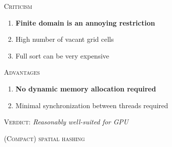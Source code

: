 \documentclass[14pt]{beamer}
\begin{document}
\begin{frame}
\centering
{
\begin{minipage}[c][.7\textheight][t]{.9\textwidth}
\centering
\scriptsize
\textsc{Criticism}\\[.3em]

\raggedright
\begin{enumerate}
\item \textbf{Finite domain is an annoying restriction}
\item High number of vacant grid cells
\item Full sort can be very expensive
\end{enumerate}

\pause
\centering
\vspace{1em}
\textsc{Advantages}\\[.3em]

\raggedright
\begin{enumerate}
\item {\bf No dynamic memory allocation required}
\item Minimal synchronization between threads required
\end{enumerate}

\vfill
\centering
\textsc{Verdict:} {\em Reasonably well-suited for GPU}
\end{minipage}
}
\end{frame}


\begin{frame}
\centering
{
\begin{minipage}[c][.7\textheight][c]{.9\textwidth}
\centering
\textsc{(Compact) spatial hashing}
\end{minipage}
}
\end{frame}
\end{document}
